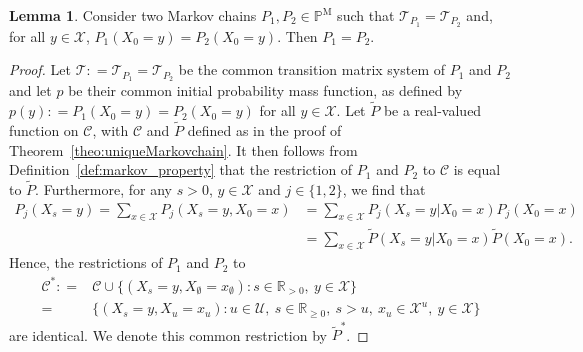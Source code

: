 \documentclass[10pt]{paper}
\theoremstyle{definition}
\newtheorem{lemma}[theorem]{Lemma}
\newcommand{\reals}{\mathbb{R}}
\newcommand{\states}{\mathcal{X}}
\newcommand{\processes}{\mathbb{P}}
\newcommand{\mprocesses}{\processes^{\mathrm{M}}}
\newcommand{\coloneqq}{:\!=}
\begin{document}
\begin{lemma}\label{lemma:samepandTissameP}
Consider two Markov chains $P_1,P_2\in\mprocesses$ such that $\mathcal{T}_{P_1}=\mathcal{T}_{P_2}$ and, for all $y\in\states$, $P_1(X_0=y)=P_2(X_0=y)$. Then $P_1=P_2$.
\end{lemma}
\begin{proof}
Let $\mathcal{T}\coloneqq\mathcal{T}_{P_1}=\mathcal{T}_{P_2}$ be the common transition matrix system of $P_1$ and $P_2$ and let $p$ be their common initial probability mass function, as defined by $p(y)\coloneqq P_1(X_0=y)=P_2(X_0=y)$ for all $y\in\states$. Let $\tilde{P}$ be a real-valued function on $\mathcal{C}$, with $\mathcal{C}$ and $\tilde{P}$ defined as in the proof of Theorem~\ref{theo:uniqueMarkovchain}. It then follows from Definition~\ref{def:markov_property} that the restriction of $P_1$ and $P_2$ to $\mathcal{C}$ is equal to $\tilde{P}$. Furthermore, for any $s>0$, $y\in\states$ and $j\in\{1,2\}$, we find that
\begin{align*}
P_j(X_s=y)
=\sum_{x\in\states}P_j(X_s=y, X_0=x)
&=\sum_{x\in\states}P_j(X_s=y\vert X_0=x)P_j(X_0=x)\\
&=\sum_{x\in\states}\tilde{P}(X_s=y\vert X_0=x)\tilde{P}(X_0=x).
\end{align*}
Hence, the restrictions of $P_1$ and $P_2$ to
\begin{align*}
\mathcal{C}^*
\coloneqq&\mathcal{C}\cup
\{
(X_s=y,X_\emptyset=x_\emptyset)
\colon 
s\in\reals_{>0},~y\in\states
\}\\
=&\{
(X_s=y,X_u=x_u)
\colon 
u\in\mathcal{U},~s\in\reals_{\geq0},~s>u,~x_u\in\states^u,~y\in\states
\}
\end{align*}
are identical. We denote this common restriction by $\tilde{P}^*$.


\end{proof}
\end{document}
